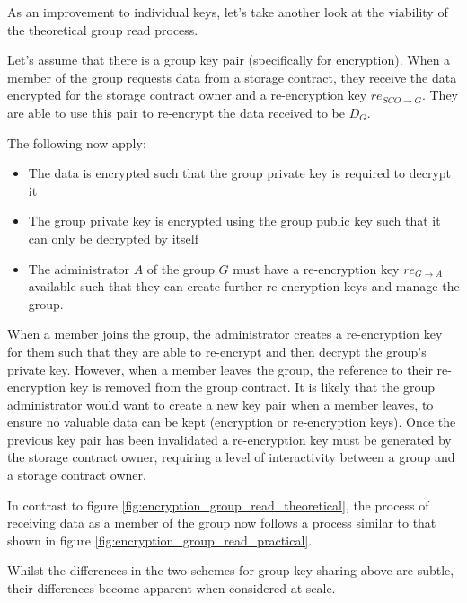 As an improvement to individual keys, let's take another look at the viability of the theoretical group read process.

Let's assume that there is a group key pair (specifically for encryption). When a member of the group requests data from a storage contract, they receive the data encrypted for the storage contract owner and a re-encryption key $re_{SCO \rightarrow G}$. They are able to use this pair to re-encrypt the data received to be $D_{G}$.



The following now apply:

\begin{itemize}
  \item The data is encrypted such that the group private key is required to decrypt it
  \item The group private key is encrypted using the group public key such that it can only be decrypted by itself
  \item The administrator $A$ of the group $G$ must have a re-encryption key $re_{G \rightarrow A}$ available such that they can create further re-encryption keys and manage the group.
\end{itemize}

When a member joins the group, the administrator creates a re-encryption key for them such that they are able to re-encrypt and then decrypt the group's private key. However, when a member leaves the group, the reference to their re-encryption key is removed from the group contract. It is likely that the group administrator would want to create a new key pair when a member leaves, to ensure no valuable data can be kept (encryption or re-encryption keys). Once the previous key pair has been invalidated a re-encryption key must be generated by the storage contract owner, requiring a level of interactivity between a group and a storage contract owner.

In contrast to figure \ref{fig:encryption_group_read_theoretical}, the process of receiving data as a member of the group now follows a process similar to that shown in figure \ref{fig:encryption_group_read_practical}.

Whilst the differences in the two schemes for group key sharing above are subtle, their differences become apparent when considered at scale.

